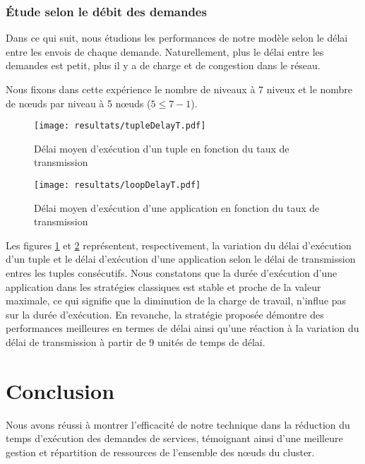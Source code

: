 \subsubsection{Étude selon le débit des demandes}
Dans ce qui suit, nous étudions les performances de notre modèle selon le délai entre les envois de chaque demande. Naturellement, plus le délai entre les demandes est petit, plus il y a de charge et de congestion dans le réseau.\par
Nous fixons dans cette expérience le nombre de niveaux à 7 niveux et le nombre de nœuds par niveau à 5 nœuds ($5 \le 7 - 1$).

\begin{figure}[H]
  \centering
  \texttt{[image: resultats/tupleDelayT.pdf]}
  \caption{Délai moyen d'exécution d'un tuple en fonction du taux de transmission}
  \label{fig:delai_tuple_debit}
\end{figure}

\begin{figure}[H]
  \centering
  \texttt{[image: resultats/loopDelayT.pdf]}
  \caption{Délai moyen d'exécution d'une application en fonction du taux de transmission}
  \label{fig:delai_application_debit}
\end{figure}

Les figures \ref{fig:delai_tuple_debit} et \ref{fig:delai_application_debit} représentent, respectivement, la variation du délai d'exécution d'un tuple et le délai d'exécution d'une application selon le délai de transmission entres les tuples consécutifs.
Nous constatons que la durée d'exécution d'une application dans les stratégies classiques est stable et proche de la valeur maximale, ce qui signifie que la diminution de la charge de travail, n'influe pas sur la durée d'exécution. En revanche, la stratégie proposée démontre des performances meilleures en termes de délai ainsi qu'une réaction à la variation du délai de transmission à partir de 9 unités de temps de délai.\par

\section{Conclusion}
Nous avons réussi à montrer l'efficacité de notre technique dans la réduction du temps d'exécution des demandes de services, témoignant ainsi d'une meilleure gestion et répartition de ressources de l'ensemble des nœuds du cluster.
